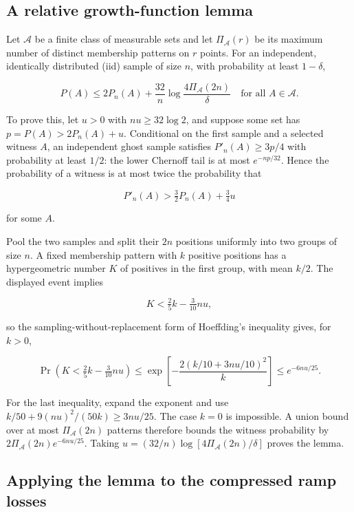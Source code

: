 \documentclass[11pt]{article}
\begin{document}
\subsection{A relative growth-function
lemma}\label{a-relative-growth-function-lemma}

Let \(\mathcal A\) be a finite class of measurable sets and let
\(\Pi_{\mathcal A}(r)\) be its maximum number of distinct membership
patterns on \(r\) points. For an independent, identically distributed
(iid) sample of size \(n\), with
probability at least \(1-\delta\),

\[
P(A)\le2P_n(A)+\frac{32}{n}
\log\frac{4\Pi_{\mathcal A}(2n)}{\delta}
\quad\text{for all }A\in\mathcal A.
\]

To prove this, let \(u>0\) with \(nu\ge32\log2\), and suppose some set
has \(p=P(A)>2P_n(A)+u\). Conditional on the first sample and a selected
witness \(A\), an independent ghost sample satisfies \(P'_n(A)\ge3p/4\)
with probability at least \(1/2\): the lower Chernoff tail is at most
\(e^{-np/32}\). Hence the probability of a witness is at most twice the
probability that

\[
P'_n(A)>\tfrac32P_n(A)+\tfrac34u
\]

for some \(A\).

Pool the two samples and split their \(2n\) positions uniformly into two
groups of size \(n\). A fixed membership pattern with \(k\) positive
positions has a hypergeometric number \(K\) of positives in the first
group, with mean \(k/2\). The displayed event implies

\[
K<\tfrac25k-\tfrac3{10}nu,
\]

so the sampling-without-replacement form of Hoeffding's inequality
gives, for \(k>0\),

\[
\Pr\left(K<\tfrac25k-\tfrac3{10}nu\right)
\le \exp\!\left[-\frac{2(k/10+3nu/10)^2}{k}\right]
\le e^{-6nu/25}.
\]

For the last inequality, expand the exponent and use
\(k/50+9(nu)^2/(50k)\ge3nu/25\). The case \(k=0\) is impossible. A union
bound over at most \(\Pi_{\mathcal A}(2n)\) patterns therefore bounds
the witness probability by \(2\Pi_{\mathcal A}(2n)e^{-6nu/25}\). Taking
\(u=(32/n)\log[4\Pi_{\mathcal A}(2n)/\delta]\) proves the lemma.

\subsection{Applying the lemma to the compressed ramp
losses}\label{applying-the-lemma-to-the-compressed-ramp-losses}
\end{document}
